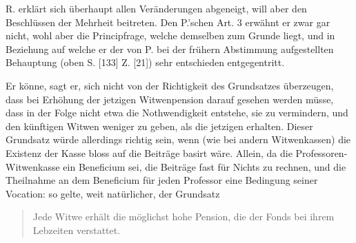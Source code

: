 R. erklärt sich überhaupt allen Veränderungen abgeneigt, will aber den Beschlüssen der Mehrheit beitreten. Den P.’schen Art. 3 erwähnt er zwar gar nicht, wohl aber die Principfrage, welche demselben zum Grunde liegt, und in Beziehung auf welche er der von P. bei der frühern Abstimmung aufgestellten Behauptung (oben S. [133] Z. [21]) sehr entschieden entgegentritt.

Er könne, sagt er, sich nicht von der Richtigkeit des Grundsatzes überzeugen, dass bei Erhöhung der jetzigen Witwenpension darauf gesehen werden müsse, dass in der Folge nicht etwa die Nothwendigkeit entstehe, sie zu vermindern, und den künftigen Witwen weniger zu geben, als die jetzigen erhalten. Dieser Grundsatz würde allerdings richtig sein, wenn (wie bei andern Witwenkassen) die Existenz der Kasse bloss auf die Beiträge basirt wäre. Allein, da die Professoren-Witwenkasse ein Beneficium sei, die Beiträge fast für Nichts zu rechnen, und die Theilnahme an dem Beneficium für jeden Professor eine Bedingung seiner Vocation: so gelte, weit natürlicher, der Grundsatz
\begin{quote}
Jede Witwe erhält die möglichst hohe Pension, die der Fonds bei ihrem Lebzeiten verstattet.
\end{quote}
